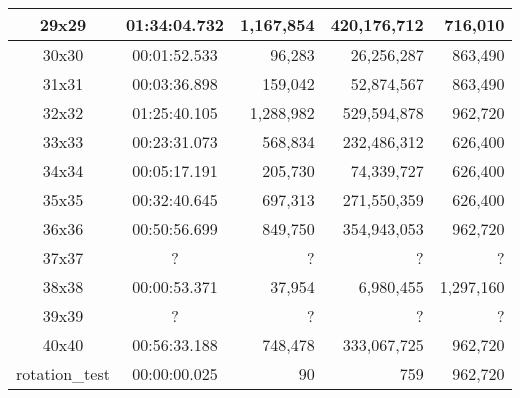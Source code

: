 \begin{center}
\begin{tabular}{|c|c|r|r|r|}
		29x29 & 01:34:04.732 & 1,167,854 & 420,176,712 & 716,010 \\ \hline
		30x30 & 00:01:52.533 & 96,283 & 26,256,287 & 863,490 \\ \hline
		31x31 & 00:03:36.898 & 159,042 & 52,874,567 & 863,490 \\ \hline
		32x32 & 01:25:40.105 & 1,288,982 & 529,594,878 & 962,720 \\ \hline
		33x33 & 00:23:31.073 & 568,834 & 232,486,312 & 626,400 \\ \hline
		34x34 & 00:05:17.191 & 205,730 & 74,339,727 & 626,400 \\ \hline
		35x35 & 00:32:40.645 & 697,313 & 271,550,359 & 626,400 \\ \hline
		36x36 & 00:50:56.699 & 849,750 & 354,943,053 & 962,720 \\ \hline
		37x37 & ? & ? & ? & ? \\ \hline
		38x38 & 00:00:53.371 & 37,954 & 6,980,455 & 1,297,160 \\ \hline
		39x39 & ? & ? & ? & ? \\ \hline
		40x40 & 00:56:33.188 & 748,478 & 333,067,725 & 962,720 \\ \hline
		rotation\_test & 00:00:00.025 & 90 & 759 & 962,720 \\ \hline

    \end{tabular}
\end{center}

